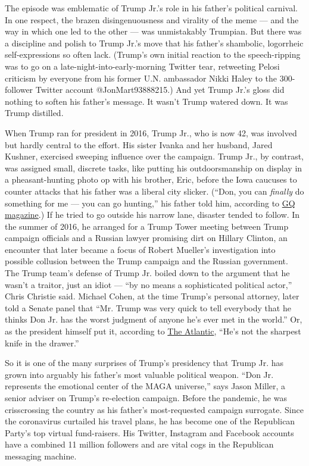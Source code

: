 The episode was emblematic of Trump Jr.'s role in his father's political
carnival. In one respect, the brazen disingenuousness and virality of
the meme --- and the way in which one led to the other --- was
unmistakably Trumpian. But there was a discipline and polish to Trump
Jr.'s move that his father's shambolic, logorrheic self-expressions so
often lack. (Trump's own initial reaction to the speech-ripping was to
go on a late-night-into-early-morning Twitter tear, retweeting Pelosi
criticism by everyone from his former U.N. ambassador Nikki Haley to the
300-follower Twitter account @JonMart93888215.) And yet Trump Jr.'s
gloss did nothing to soften his father's message. It wasn't Trump
watered down. It was Trump distilled.

When Trump ran for president in 2016, Trump Jr., who is now 42, was
involved but hardly central to the effort. His sister Ivanka and her
husband, Jared Kushner, exercised sweeping influence over the campaign.
Trump Jr., by contrast, was assigned small, discrete tasks, like putting
his outdoorsmanship on display in a pheasant-hunting photo op with his
brother, Eric, before the Iowa caucuses to counter attacks that his
father was a liberal city slicker. (``Don, you can \emph{finally} do
something for me --- you can go hunting,'' his father told him,
according to
\href{https://www.gq.com/story/real-story-of-donald-trump-jr}{GQ
magazine}.) If he tried to go outside his narrow lane, disaster tended
to follow. In the summer of 2016, he arranged for a Trump Tower meeting
between Trump campaign officials and a Russian lawyer promising dirt on
Hillary Clinton, an encounter that later became a focus of Robert
Mueller's investigation into possible collusion between the Trump
campaign and the Russian government. The Trump team's defense of Trump
Jr. boiled down to the argument that he wasn't a traitor, just an idiot
--- ``by no means a sophisticated political actor,'' Chris Christie
said. Michael Cohen, at the time Trump's personal attorney, later told a
Senate panel that ``Mr. Trump was very quick to tell everybody that he
thinks Don Jr. has the worst judgment of anyone he's ever met in the
world.'' Or, as the president himself put it, according to
\href{https://www.theatlantic.com/magazine/archive/2019/10/trump-dynasty/596674/}{The
Atlantic}, ``He's not the sharpest knife in the drawer.''

So it is one of the many surprises of Trump's presidency that Trump Jr.
has grown into arguably his father's most valuable political weapon.
``Don Jr. represents the emotional center of the MAGA universe,'' says
Jason Miller, a senior adviser on Trump's re-election campaign. Before
the pandemic, he was crisscrossing the country as his father's
most-requested campaign surrogate. Since the coronavirus curtailed his
travel plans, he has become one of the Republican Party's top virtual
fund-raisers. His Twitter, Instagram and Facebook accounts have a
combined 11 million followers and are vital cogs in the Republican
messaging machine.

